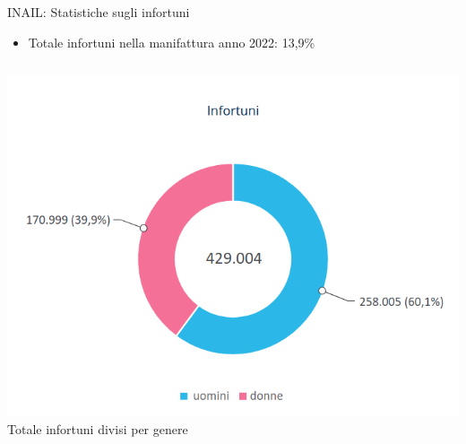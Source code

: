 \documentclass{beamer}
\begin{document}
\begin{frame}{INAIL: Statistiche sugli infortuni}
  \begin{itemize}
  		\item Totale infortuni nella manifattura anno 2022: 13,9\%
  \end{itemize}  	  
  \begin{columns}
    \begin{column}{0.4\textwidth}
      \centering
      \includegraphics[width=\textwidth]{images/totaleinfortuni.png}
      \vspace{2mm}
      \small{Totale infortuni divisi per genere}
    \end{column}


\end{columns}
\end{frame}
\end{document}
